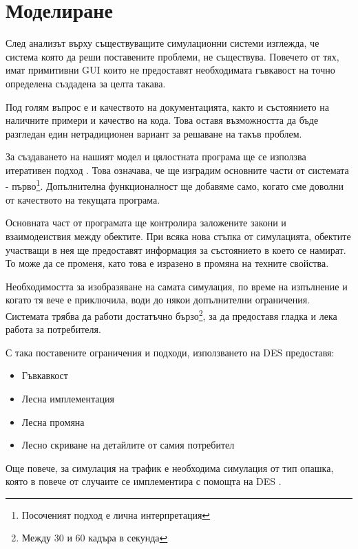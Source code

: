 \section{Моделиране}
	
	След анализът върху съществуващите симулационни системи изглежда, че
	система която да реши поставените проблеми, не съществува.
	Повечето от тях, имат примитивни \ac{GUI} които не предоставят
	необходимата гъвкавост на точно определена създадена за целта такава.
	
	Под голям въпрос е и качеството на документацията, както и състоянието на
	наличните примери и качество на кода. Това оставя възможността да бъде разгледан
	един нетрадиционен вариант за решаване на такъв проблем.
	
	За създаването на нашият модел и цялостната програма ще се използва итеративен подход \cite{ArtOfAgile}.
	Това означава, че ще изградим основните части от системата - 
	първо\footnote{Посоченият подход е лична интерпретация}. Допълнителна 
	функционалност ще добавяме само, когато сме доволни от качеството на текущата програма. 
			
	Основната част от програмата ще контролира заложените закони и взаимодеиствия	между обектите.
	При всяка нова стъпка от симулацията, обектите участващи в нея ще предоставят информация за
	състоянието в което се намират. То може да се променя, като това е изразено в промяна
	на техните свойства.
	
	Необходимостта за изобразяване на самата симулация, по време на изпълнение и когато тя вече е приключила,
	води до някои допълнителни ограничения. Системата трябва да работи достатъчно бързо\footnote{Между 30 и 60 кадъра в секунда},
	за да предоставя гладка и лека работа за потребителя.
	
	С така поставените ограничения и подходи, използването на \ac{DES} предоставя:
	
	\begin{itemize}
		\item Гъвкавкост
		
		\item Лесна имплементация
		
		\item Лесна промяна
		
		\item Лесно скриване на детайлите от самия потребител	
				
	\end{itemize}				
	
	Още повече, за симулация на трафик е необходима симулация от тип опашка, която в повече от случаите
	се имплементира с помощта на \ac{DES} \cite{Barlas}.
	
